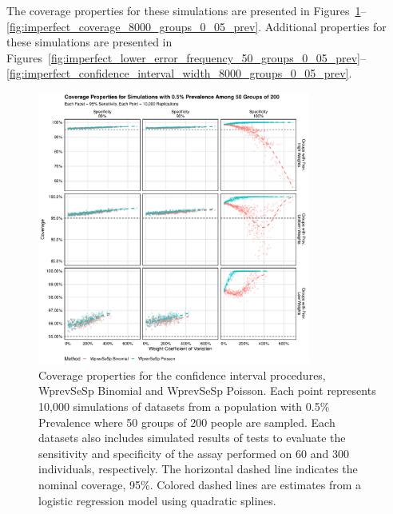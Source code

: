 \documentclass[AMA,STIX1COL]{WileyNJD-v2}
\begin{document}
The coverage properties for these simulations are presented in Figures~\ref{fig:imperfect_coverage_50_groups_0_005_prev}--\ref{fig:imperfect_coverage_8000_groups_0_05_prev}.
Additional properties for these simulations are presented in Figures~\ref{fig:imperfect_lower_error_frequency_50_groups_0_05_prev}--\ref{fig:imperfect_confidence_interval_width_8000_groups_0_05_prev}.

\begin{figure}
\centering
\includegraphics[width=0.8\textwidth]{figures/imperfect_coverage_50_groups_0_005_prev.pdf}
\caption{Coverage properties for the confidence interval procedures, WprevSeSp Binomial and WprevSeSp Poisson.
Each point represents 10,000 simulations of datasets from a population with 0.5\% Prevalence where 50 groups of 200 people are sampled.
Each datasets also includes simulated results of tests to evaluate the sensitivity and specificity of the assay performed on 60 and 300 individuals, respectively.
The horizontal dashed line indicates the nominal coverage, 95\%.
Colored dashed lines are estimates from a logistic regression model using quadratic splines.}
\label{fig:imperfect_coverage_50_groups_0_005_prev}
\end{figure}
\end{document}
